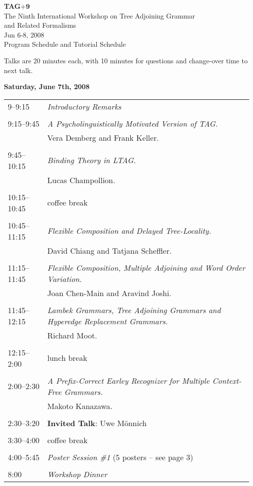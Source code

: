 \documentclass[12pt]{article}
\begin{document}
\begin{center}
{\Large\bf TAG$\mathbf{+9}$}\\
\smallskip
{\Large The Ninth International Workshop on Tree Adjoining Grammar}\\
\smallskip
{\Large and Related Formalisms}\\
\bigskip
{\large Jun 6-8, 2008}\\
\smallskip
{\large Program Schedule and Tutorial Schedule}
\end{center}

\bigskip
Talks are 20 minutes each, with 10 minutes for questions and change-over time to next talk.
\smallskip

\noindent \textbf{Saturday, June 7th, 2008}
\bigskip

\begin{tabular}{lp{5.2in}}
9--9:15 & \textit{Introductory Remarks} \\
& \\
9:15--9:45 & \textit{A Psycholinguistically Motivated Version of TAG.} \\
& Vera Demberg and Frank Keller. \\
& \\
9:45--10:15 & \textit{Binding Theory in LTAG.} \\
& Lucas Champollion. \\
& \\
10:15--10:45 & coffee break \\
& \\
10:45--11:15 & \textit{Flexible Composition and Delayed Tree-Locality.} \\
& David Chiang and Tatjana Scheffler. \\
& \\
11:15--11:45 & \textit{Flexible Composition, Multiple Adjoining and Word Order Variation.} \\
& Joan Chen-Main and Aravind Joshi. \\
& \\
11:45--12:15 & \textit{Lambek Grammars, Tree Adjoining Grammars and Hyperedge Replacement Grammars.} \\
& Richard Moot. \\
& \\
12:15--2:00 & lunch break \\
& \\
2:00--2:30 & \textit{A Prefix-Correct Earley Recognizer for Multiple Context-Free Grammars.} \\
& Makoto Kanazawa. \\
& \\
2:30--3:20 & \textbf{Invited Talk}: Uwe M\"{o}nnich \\
& \\
3:30--4:00 & coffee break \\
& \\
4:00--5:45 & \textit{Poster Session \#1} (5 posters -- see page 3) \\
& \\
8:00 & \textit{Workshop Dinner}
\end{tabular}
\bigskip
\end{document}
